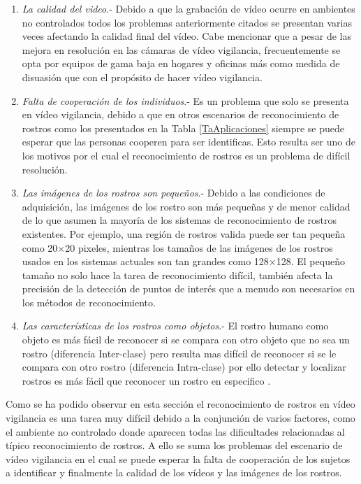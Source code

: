 \begin{enumerate}
\item \textit{La calidad del video}.- Debido a que la grabación de vídeo ocurre en ambientes no controlados todos los problemas anteriormente citados se presentan varias veces afectando la calidad final del vídeo. Cabe mencionar que a pesar de las mejora en resolución en las cámaras de vídeo vigilancia, frecuentemente se opta por equipos de gama baja en hogares y oficinas más como medida de disuasión que con el propósito de hacer vídeo vigilancia.
\item \textit{Falta de cooperación de los individuos}.- Es un problema que solo se presenta en vídeo vigilancia, debido a que en otros escenarios de reconocimiento de rostros como los presentados en la Tabla \ref{TaAplicaciones} siempre se puede esperar que las personas cooperen para ser identificas. Esto resulta ser uno de los motivos por el cual el reconocimiento de rostros es un problema de difícil resolución.
\item \textit{Las imágenes de los  rostros son pequeños}.- Debido a las condiciones de adquisición, las imágenes de los rostro son más pequeñas y de menor calidad de lo que asumen la mayoría de los sistemas de reconocimiento de rostros existentes. Por ejemplo, una región de rostros valida puede ser tan pequeña como 20$\times$20 pixeles, mientras los tamaños de las imágenes de los rostros usados en los sistemas actuales son tan grandes como 128$\times$128. El pequeño tamaño no solo hace la tarea de reconocimiento difícil, también afecta la precisión de la detección de puntos de interés que a menudo son necesarios en los métodos de reconocimiento.
\item \textit{Las características de los rostros como objetos}.- El rostro humano como objeto es más fácil de reconocer si se compara con otro objeto que no sea un rostro (diferencia Inter-clase) pero resulta mas difícil de reconocer si se le compara con otro rostro (diferencia Intra-clase) por ello detectar y localizar rostros es más fácil que reconocer un rostro en especifico \citep{zhao2003face}. 
\end{enumerate}

Como se ha podido observar en esta sección el reconocimiento de rostros en vídeo vigilancia es una tarea muy difícil debido a la conjunción de varios factores, como el ambiente no controlado donde aparecen todas las dificultades relacionadas al típico reconocimiento de rostros. A ello se suma los problemas del escenario de vídeo vigilancia en el cual se puede esperar la falta de cooperación de los sujetos a identificar y finalmente la calidad de los vídeos y las imágenes de los rostros.

